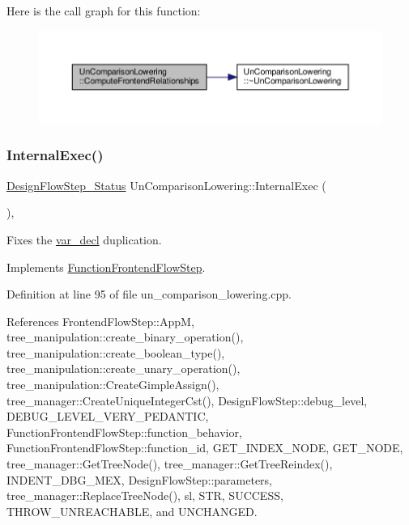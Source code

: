 Here is the call graph for this function\+:
\nopagebreak
\begin{figure}[H]
\begin{center}
\leavevmode
\includegraphics[width=350pt]{dc/d54/classUnComparisonLowering_ad1d8d14acb85fe2a1e12ccfff206af8e_cgraph}
\end{center}
\end{figure}
\mbox{\label{classUnComparisonLowering_ac4701f059a92948a4b7a5157b53a36df}} 
\subsubsection{\texorpdfstring{Internal\+Exec()}{InternalExec()}}
{\footnotesize\ttfamily \hyperlink{design__flow__step_8hpp_afb1f0d73069c26076b8d31dbc8ebecdf}{Design\+Flow\+Step\+\_\+\+Status} Un\+Comparison\+Lowering\+::\+Internal\+Exec (\begin{DoxyParamCaption}{ }\end{DoxyParamCaption})\hspace{0.3cm}{\ttfamily [override]}, {\ttfamily [virtual]}}



Fixes the \hyperlink{structvar__decl}{var\+\_\+decl} duplication. 



Implements \hyperlink{classFunctionFrontendFlowStep_a00612f7fb9eabbbc8ee7e39d34e5ac68}{Function\+Frontend\+Flow\+Step}.



Definition at line 95 of file un\+\_\+comparison\+\_\+lowering.\+cpp.



References Frontend\+Flow\+Step\+::\+AppM, tree\+\_\+manipulation\+::create\+\_\+binary\+\_\+operation(), tree\+\_\+manipulation\+::create\+\_\+boolean\+\_\+type(), tree\+\_\+manipulation\+::create\+\_\+unary\+\_\+operation(), tree\+\_\+manipulation\+::\+Create\+Gimple\+Assign(), tree\+\_\+manager\+::\+Create\+Unique\+Integer\+Cst(), Design\+Flow\+Step\+::debug\+\_\+level, D\+E\+B\+U\+G\+\_\+\+L\+E\+V\+E\+L\+\_\+\+V\+E\+R\+Y\+\_\+\+P\+E\+D\+A\+N\+T\+IC, Function\+Frontend\+Flow\+Step\+::function\+\_\+behavior, Function\+Frontend\+Flow\+Step\+::function\+\_\+id, G\+E\+T\+\_\+\+I\+N\+D\+E\+X\+\_\+\+N\+O\+DE, G\+E\+T\+\_\+\+N\+O\+DE, tree\+\_\+manager\+::\+Get\+Tree\+Node(), tree\+\_\+manager\+::\+Get\+Tree\+Reindex(), I\+N\+D\+E\+N\+T\+\_\+\+D\+B\+G\+\_\+\+M\+EX, Design\+Flow\+Step\+::parameters, tree\+\_\+manager\+::\+Replace\+Tree\+Node(), sl, S\+TR, S\+U\+C\+C\+E\+SS, T\+H\+R\+O\+W\+\_\+\+U\+N\+R\+E\+A\+C\+H\+A\+B\+LE, and U\+N\+C\+H\+A\+N\+G\+ED.

